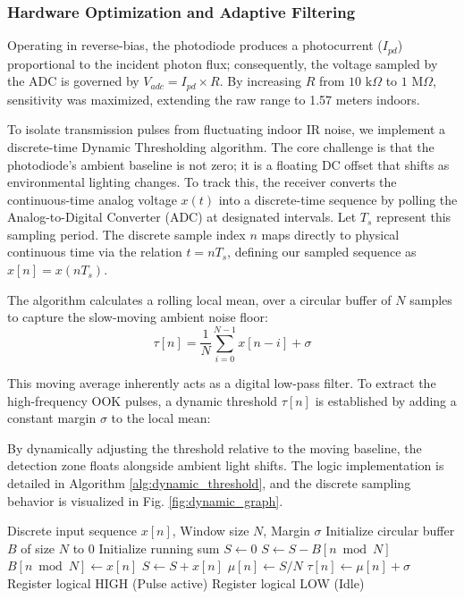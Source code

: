 \documentclass[conference]{IEEEtran}
\begin{document}
\subsubsection{Hardware Optimization and Adaptive Filtering}
Operating in reverse-bias, the photodiode produces a photocurrent ($I_{pd}$) proportional to the incident photon flux; consequently, the voltage sampled by the ADC is governed by $V_{adc} = I_{pd} \times R$. By increasing $R$ from $10\text{ k}\Omega$ to $1\text{ M}\Omega$, sensitivity was maximized, extending the raw range to 1.57 meters indoors.

To isolate transmission pulses from fluctuating indoor IR noise, we implement a discrete-time Dynamic Thresholding algorithm. The core challenge is that the photodiode's ambient baseline is not zero; it is a floating DC offset that shifts as environmental lighting changes. To track this, the receiver converts the continuous-time analog voltage $x(t)$ into a discrete-time sequence by polling the Analog-to-Digital Converter (ADC) at designated intervals. Let $T_s$ represent this sampling period. The discrete sample index $n$ maps directly to physical continuous time via the relation $t = n T_s$, defining our sampled sequence as $x[n] = x(n T_s)$. 

The algorithm calculates a rolling local mean, over a circular buffer of $N$ samples to capture the slow-moving ambient noise floor:
\begin{equation}
    \tau[n] = \frac{1}{N} \sum_{i=0}^{N-1} x[n-i] + \sigma \label{eq:thres}
\end{equation}

This moving average inherently acts as a digital low-pass filter. To extract the high-frequency OOK pulses, a dynamic threshold $\tau[n]$ is established by adding a constant margin $\sigma$ to the local mean:

By dynamically adjusting the threshold relative to the moving baseline, the detection zone floats alongside ambient light shifts. The logic implementation is detailed in Algorithm \ref{alg:dynamic_threshold}, and the discrete sampling behavior is visualized in Fig. \ref{fig:dynamic_graph}.

\begin{algorithm}[htbp]
\caption{Dynamic Thresholding for OOK Demodulation}
\label{alg:dynamic_threshold}
\begin{algorithmic}[1]
\Require Discrete input sequence $x[n]$, Window size $N$, Margin $\sigma$
\State Initialize circular buffer $B$ of size $N$ to 0
\State Initialize running sum $S \leftarrow 0$
    \State $S \leftarrow S - B[n \bmod N]$ 
    \State $B[n \bmod N] \leftarrow x[n]$ 
    \State $S \leftarrow S + x[n]$
    \State $\mu[n] \leftarrow S / N$ 
    \State $\tau[n] \leftarrow \mu[n] + \sigma$ 
        \State Register logical HIGH (Pulse active)
    \Else
        \State Register logical LOW (Idle)
    \EndIf
\EndFor
\end{algorithmic}
\end{algorithm}
\end{document}
